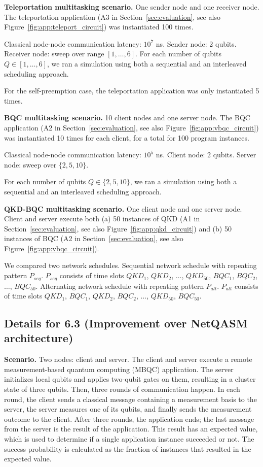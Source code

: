 \textbf{Teleportation multitasking scenario.}
One sender node and one receiver node.
The teleportation application (A3 in Section~\ref{sec:evaluation}, see also Figure~\ref{fig:app:teleport_circuit}) was instantiated 100 times.

Classical node-node communication latency: $10^7$ ns.
Sender node: 2 qubits.
Receiver node: sweep over range $[1, \dots, 6]$.
For each number of qubits $Q \in [1, \dots, 6]$, we ran a simulation using both a sequential and an interleaved scheduling approach.

For the self-preemption case, the teleportation application was only instantiated 5 times.

\textbf{BQC multitasking scenario.}
10 client nodes and one server node.
The BQC application (A2 in Section~\ref{sec:evaluation}, see also Figure~\ref{fig:app:vbqc_circuit}) was instantiated 10 times for each client, for a total for 100 program instances.

Classical node-node communication latency: $10^5$ ns.
Client node: 2 qubits.
Server node: sweep over $\{2, 5, 10\}$.

For each number of qubits $Q \in \{2, 5, 10\}$, we ran a simulation using both a sequential and an interleaved scheduling approach.

\textbf{QKD-BQC multitasking scenario.}
One client node and one server node.
Client and server execute both (a) 50 instances of QKD (A1 in Section~\ref{sec:evaluation}, see also Figure~\ref{fig:app:qkd_circuit}) and (b) 50 instances of BQC (A2 in Section~\ref{sec:evaluation}, see also Figure~\ref{fig:app:vbqc_circuit}).

We compared two network schedules.
Sequential network schedule with repeating pattern $P_{seq}$. $P_{seq}$ consists of time slots $QKD_1$, $QKD_2$, $\dots$, $QKD_{50}$, $BQC_1$, $BQC_2$, $\dots$, $BQC_{50}$.
Alternating network schedule with repeating pattern $P_{alt}$. $P_{alt}$ consists of time slots $QKD_1$, $BQC_1$, $QKD_2$, $BQC_2$, $\dots$, $QKD_{50}$, $BQC_{50}$.

\subsection{Details for 6.3 (Improvement over NetQASM architecture)}

\textbf{Scenario.}
Two nodes: client and server.
The client and server execute a remote measurement-based quantum computing (MBQC) application.
The server initializes local qubits and applies two-qubit gates on them, resulting in a cluster state of three qubits.
Then, three rounds of communication happen.
In each round, the client sends a classical message containing a measurement basis to the server, the server measures one of its qubits, and finally sends the measurement outcome to the client.
After three rounds, the application ends; the last message from the server is the result of the application.
This result has an expected value, which is used to determine if a single application instance succeeded or not.
The success probability is calculated as the fraction of instances that resulted in the expected value.

